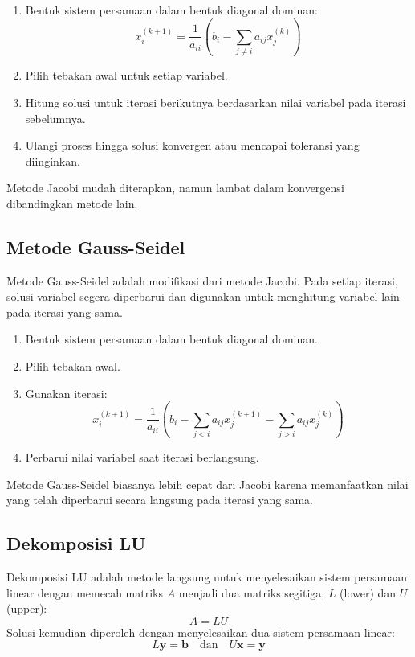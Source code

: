 \documentclass[a4paper,extrafontsizes, 9pt]{memoir}
\begin{document}
\begin{multicols}{3}
          \begin{enumerate}
            \item Bentuk sistem persamaan dalam bentuk diagonal dominan:
            \[
            x_i^{(k+1)} = \frac{1}{a_{ii}} \left(b_i - \sum_{j \neq i} a_{ij} x_j^{(k)}\right)
            \]
            \item Pilih tebakan awal untuk setiap variabel.
            \item Hitung solusi untuk iterasi berikutnya berdasarkan nilai variabel pada iterasi sebelumnya.
            \item Ulangi proses hingga solusi konvergen atau mencapai toleransi yang diinginkan.
          \end{enumerate}

          Metode Jacobi mudah diterapkan, namun lambat dalam konvergensi dibandingkan metode lain.

          \subsection*{\small Metode Gauss-Seidel}
          Metode Gauss-Seidel adalah modifikasi dari metode Jacobi. Pada setiap iterasi, solusi variabel segera diperbarui dan digunakan untuk menghitung variabel lain pada iterasi yang sama.

          \begin{enumerate}
            \item Bentuk sistem persamaan dalam bentuk diagonal dominan.
            \item Pilih tebakan awal.
            \item Gunakan iterasi:
            \[
            x_i^{(k+1)} = \frac{1}{a_{ii}} \left(b_i - \sum_{j < i} a_{ij} x_j^{(k+1)} - \sum_{j > i} a_{ij} x_j^{(k)}\right)
            \]
            \item Perbarui nilai variabel saat iterasi berlangsung.
          \end{enumerate}

          Metode Gauss-Seidel biasanya lebih cepat dari Jacobi karena memanfaatkan nilai yang telah diperbarui secara langsung pada iterasi yang sama.

          \subsection*{\small Dekomposisi LU}
          Dekomposisi LU adalah metode langsung untuk menyelesaikan sistem persamaan linear dengan memecah matriks \(A\) menjadi dua matriks segitiga, \(L\) (lower) dan \(U\) (upper):
          \[
          A = LU
          \]
          Solusi kemudian diperoleh dengan menyelesaikan dua sistem persamaan linear:
          \[
          L \mathbf{y} = \mathbf{b} \quad \text{dan} \quad U \mathbf{x} = \mathbf{y}
          \]


\end{multicols}
\end{document}
